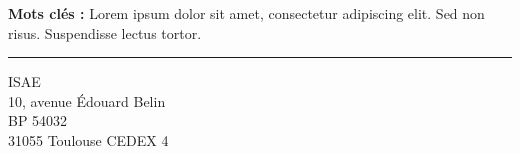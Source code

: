 \documentclass[a4paper,12pt]{report}
\theoremstyle{break}
\begin{document}
{\textbf{Mots clés :}}
Lorem ipsum dolor sit amet, consectetur adipiscing elit. Sed non risus. Suspendisse lectus tortor.
\\
\noindent\rule[2pt]{\textwidth}{0.5pt}
\begin{center}
  ISAE\\
  10, avenue Édouard Belin\\
  BP 54032\\
  31055 Toulouse CEDEX 4
\end{center}
\vspace*{\fill}
\end{document}
